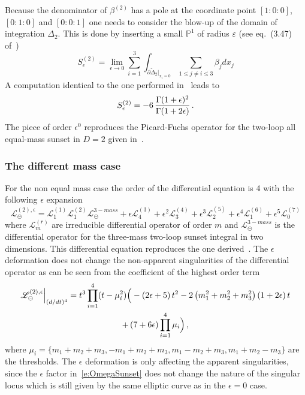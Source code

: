 \documentclass[a4paper,12pt]{article}
\numberwithin{equation}{section}
\numberwithin{figure}{section}
\def\su{\circleddash}
\begin{document}
Because the denominator of $\beta^{(2)}$ has a pole at the coordinate
point $[1:0:0]$, $[0:1:0]$ and $[0:0:1]$ one needs to consider the
blow-up  of the domain of integration $\Delta_2$. This is done by inserting a small
$\mathbb P^1$ of radius $\varepsilon$ (see eq.~(3.47) of~\cite{Bloch:2016izu})
\begin{equation}
    S_\epsilon^{(2)}=\lim_{\epsilon\to0} \sum_{i=1}^3
    \int_{\partial\tilde\Delta_2|_{x_i=0}} \sum_{1\leq j\neq i\leq 3}
    \beta_j dx_j
\end{equation}
A computation identical to the one performed in~\cite{Bloch:2016izu} leads to
\begin{equation}
  S_\epsilon^{(2)}=  -6 \, {\Gamma(1+\epsilon)^2\over \Gamma(1+2\epsilon)} \, . 
\end{equation}
The piece of order $\epsilon^0$ reproduces the Picard-Fuchs operator
for the two-loop all equal-mass sunset in $D=2$ given
in~\cite{Bloch:2013tra,Bloch:2013tra,Vanhove:2014wqa,Bonisch:2020qmm,Pogel:2022vat}.

\subsubsection{The different mass case}\label{sec:2sunset3mass}

For the non equal mass case the order of the differential equation is
4 with the following $\epsilon$ expansion
\begin{equation}
     \mathscr{L}^{(2),\epsilon}_\su =   \mathscr{L}^{(1)}_1
     \mathscr{L}^{(2)}_1    \mathscr{L}^{3-mass}_\su +\epsilon
     \mathscr{L}^{(3)}_4+\epsilon^2  \mathscr{L}^{(4)}_3+\epsilon^3
     \mathscr{L}^{(5)}_2+ \epsilon^4 \mathscr{L}^{(6)}_1 +\epsilon^5
    \mathscr{L}^{(7)}_0
   \end{equation} 
   where $ \mathscr{L}^{(r)}_m$  are irreducible differential operator
   of  order $m$ and $\mathscr{L}^{3-mass}_\su$ is the differential
   operator for the three-mass two-loop sunset integral in two
   dimensions. This differential equation reproduces the one 
   derived~\cite{Remiddi:2013joa,Remiddi:2016gno}.
%
The $\epsilon$ deformation does not change the non-apparent
singularities of the differential operator as can be seen from the
coefficient of the highest order term
\begin{multline}
  \mathscr{L}^{(2),\epsilon}_\su \Big\vert_{(d/dt)^4}= t^3\prod_{i=1}^4 (t-
  \mu_i^2) \Big(-\left(2 \epsilon +5\right) t^{2}-2
    \left(m_{1}^{2}+m_{2}^{2}+m_{3}^{2}\right) \left(1+2 \epsilon
    \right) t \cr+ \left(7+6 \epsilon \right)\prod_{i=1}^4 \mu_i
\Big)  \, , 
\end{multline}
where $\mu_i=\{m_1+m_2+m_3,-m_1+m_2+m_3,m_1-m_2+m_3,m_1+m_2-m_3\}$ are
the thresholds.  The $\epsilon$ deformation is only affecting the
apparent singularities, since the $\epsilon$ factor
in~\eqref{e:OmegaSunset} does not change the nature of the singular
locus which is still given by the same elliptic curve as in the
$\epsilon=0$ case.
   
\end{document}
